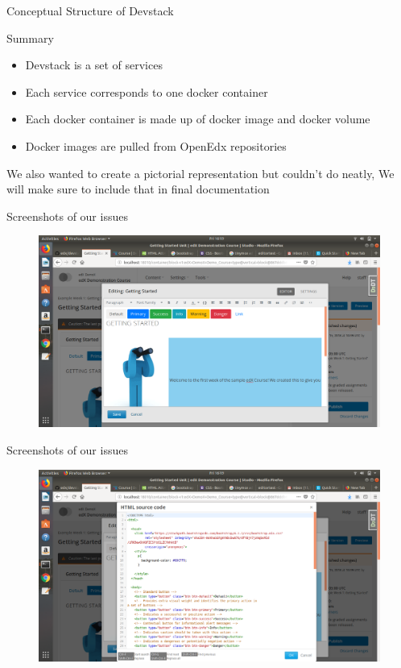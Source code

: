 \documentclass{beamer}
\begin{document}
	\begin{frame}{Conceptual Structure of Devstack}
		\begin{block}{Summary}
			\begin{itemize} \pause
				\item Devstack is a set of services \pause
				\item Each service corresponds to one docker container \pause
				\item Each docker container is made up of docker image and docker volume \pause
				\item Docker images are pulled from OpenEdx repositories 
			\end{itemize}
			\tiny{We also wanted to create a pictorial representation but couldn't do neatly, We will make sure to include that in final documentation}
		\end{block}
	\end{frame}
	
	\begin{frame}{Screenshots of our issues}
		\begin{figure}
			\includegraphics[width=\linewidth,height=\textheight,keepaspectratio]{./18-06-18/issue-1.png}
		\end{figure}
	\end{frame}
	
	\begin{frame}{Screenshots of our issues}
		\begin{figure}
			\includegraphics[width=\linewidth,height=\textheight,keepaspectratio]{./18-06-18/issue-2.png}
		\end{figure}
	\end{frame}
	
\end{document}
